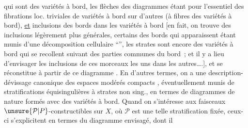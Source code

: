 %
qui sont des variétés à bord, les  flèches des
diagrammes étant pour l'essentiel des fibrations loc. triviales de variétés à bord sur d'autres
(à fibres des variétés à bord), \uline{et}  inclusions
des bords dans les variétés à bord \deleted{(}[en fait, on trouve des inclusions légèrement
plus générales, certains des bords qui apparaissent étant munis d'une décomposition
cellulaire ``'',
 les
strates  sont encore des variétés à bord qui se
recollent suivant des parties communes du
bord~; et il y a lieu d'envisager  les inclusions
de ces morceaux les uns dans les
autres\ldots.\deleted{)}], et se réconstitue à partir de
ce diagramme . En d'autres termes, on
a une description-dévissage canonique
des espaces modérés compacts , éventuellement
munis de stratifications équisingulières
à strates non sing., en termes de diagrammes
 de nature  formés avec des variétés
à bord. Quand on s'intéresse aux faisceaux
$\unsure{\mathcal P|P}$-constructibles sur $X$, où $\mathcal P$ est une telle
stratification fixée, ceux-ci s'explicitent en
termes du diagramme envisagé, dont il

